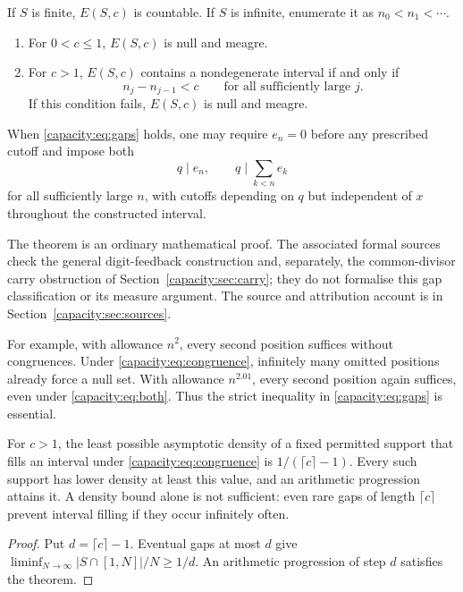 \documentclass[11pt]{article}
\begin{document}
\begin{theorem}\label{capacity:thm:main}
If $S$ is finite, $E(S,c)$ is countable. If $S$ is infinite, enumerate it as
$n_0<n_1<\cdots$.
\begin{enumerate}
\item For $0<c\le1$, $E(S,c)$ is null and meagre.
\item For $c>1$, $E(S,c)$ contains a nondegenerate interval if and only if
\[
 n_j-n_{j-1}<c\qquad\text{for all sufficiently large }j.
 \tag{3}\label{capacity:eq:gaps}
\]
If this condition fails, $E(S,c)$ is null and meagre.
\end{enumerate}
When \eqref{capacity:eq:gaps} holds, one may require $e_n=0$ before any prescribed
cutoff and impose both
\[
 q\mid e_n,\qquad q\mid\sum_{k<n}e_k
 \tag{4}\label{capacity:eq:both}
\]
for all sufficiently large $n$, with cutoffs depending on $q$ but independent
of $x$ throughout the constructed interval.
\end{theorem}
The theorem is an ordinary mathematical proof. The associated formal sources
check the general digit-feedback construction and, separately, the
common-divisor carry obstruction of Section~\ref{capacity:sec:carry}; they do not
formalise this gap classification or its measure argument. The source and
attribution account is in Section~\ref{capacity:sec:sources}.

For example, with allowance $n^2$, every second position suffices without
congruences. Under \eqref{capacity:eq:congruence}, infinitely many omitted positions
already force a null set. With allowance $n^{2.01}$, every second position
again suffices, even under \eqref{capacity:eq:both}. Thus the strict inequality in
\eqref{capacity:eq:gaps} is essential.

\begin{corollary}\label{capacity:cor:density}
For $c>1$, the least possible asymptotic density of a fixed permitted support
that fills an interval under \eqref{capacity:eq:congruence} is
$1/(\lceil c\rceil-1)$. Every such support has lower density at least this
value, and an arithmetic progression attains it. A density bound alone is
not sufficient: even rare gaps of length $\lceil c\rceil$ prevent interval
filling if they occur infinitely often.
\end{corollary}
\begin{proof}
Put $d=\lceil c\rceil-1$. Eventual gaps at most $d$ give
$\liminf_{N\to\infty}|S\cap[1,N]|/N\ge1/d$. An arithmetic progression of
step $d$ satisfies the theorem.
\end{proof}
\end{document}

